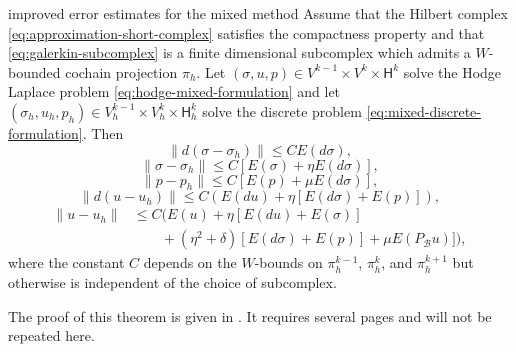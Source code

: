 \begin{Theorem}{{improved error estimates for the mixed method}}\label{thm:mixed-improved-errors}
{Assume that the Hilbert complex \eqref{eq:approximation-short-complex} satisfies the compactness property and that \eqref{eq:galerkin-subcomplex} is a finite dimensional subcomplex which admits a $W$-bounded cochain projection $\pi_h$. Let $(\sigma,u,p)\in V^{k-1}\times V^k\times\mathsf H^k$ solve the Hodge Laplace problem \eqref{eq:hodge-mixed-formulation} and let $(\sigma_h,u_h,p_h)\in V_h^{k-1}\times V_h^k\times\mathsf H_h^k$ solve the discrete problem \eqref{eq:mixed-discrete-formulation}. Then}
\begin{equation}\label{eq:mixed-improved-dsigma}
\|d(\sigma-\sigma_h)\|\leq CE(d\sigma),
\end{equation}
\begin{equation}\label{eq:mixed-improved-sigma}
\|\sigma-\sigma_h\|\leq C[E(\sigma)+\eta E(d\sigma)],
\end{equation}
\begin{equation}\label{eq:mixed-improved-p}
\|p-p_h\|\leq C[E(p)+\mu E(d\sigma)],
\end{equation}
\begin{equation}\label{eq:mixed-improved-du}
\|d(u-u_h)\|\leq C(E(du)+\eta[E(d\sigma)+E(p)]),
\end{equation}
\begin{equation}\label{eq:mixed-improved-u}
\begin{aligned}
\|u-u_h\|&\leq C\big(E(u)+\eta[E(du)+E(\sigma)]\\
&\qquad+(\eta^2+\delta)[E(d\sigma)+E(p)]+\mu E(P_{\mathcal B}u)]\big),
\end{aligned}
\end{equation}
{where the constant $C$ depends on the $W$-bounds on $\pi_h^{k-1}$, $\pi_h^k$, and $\pi_h^{k+1}$ but otherwise is independent of the choice of subcomplex.}
\end{Theorem}

{The proof of this theorem is given in . It requires several pages and will not be repeated here.}

